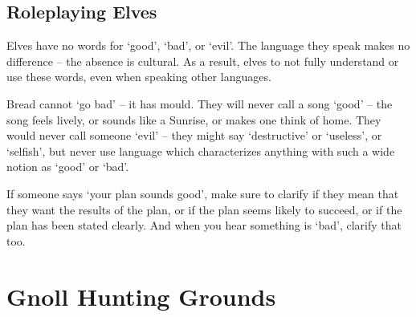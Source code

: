 \begin{multicols}{2}
\subsection{Roleplaying Elves}
\label{elfRoleplaying}

Elves have no words for `good', `bad', or `evil'.
The language they speak makes no difference -- the absence is cultural.
As a result, elves to not fully understand or use these words, even when speaking other languages.

Bread cannot `go bad' -- it has mould.
They will never call a song `good' -- the song feels lively, or sounds like a Sunrise, or makes one think of home.
They would never call someone `evil' -- they might say `destructive' or `useless', or `selfish', but never use language which characterizes anything with such a wide notion as `good' or `bad'.

If someone says `your plan sounds good', make sure to clarify if they mean that they want the results of the plan, or if the plan seems likely to succeed, or if the plan has been stated clearly.
And when you hear something is `bad', clarify that too.

\end{multicols}

\section[Gnolls]{Gnoll Hunting Grounds \Nl}
\label{GnollishGrounds}

